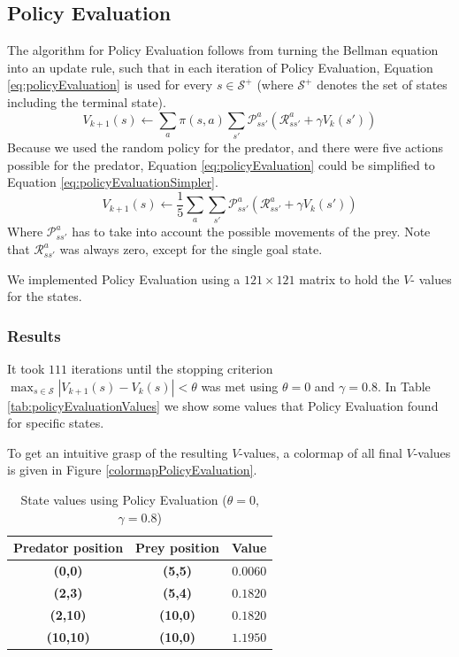 \documentclass{article}
\begin{document}
\subsection{ Policy Evaluation}
The algorithm for Policy Evaluation follows from turning the Bellman equation into an update rule, such that in each iteration of Policy Evaluation, Equation \ref{eq:policyEvaluation} is used for every $s \in \mathcal S^{+}$ (where $\mathcal S^{+}$ denotes the set of states including the terminal state).
\begin{equation}\label{eq:policyEvaluation}
V_{k+1}(s) \leftarrow \sum_{a} \pi (s,a) \sum_{s'}  \mathcal P_{s s'}^{a} \left( \mathcal R_{s s'}^{a} 
+ \gamma V_{k}(s') \right) 
\end{equation}
Because we used the random policy for the predator, and there were five actions possible for the predator, Equation \ref{eq:policyEvaluation} could be simplified to Equation \ref{eq:policyEvaluationSimpler}.
\begin{equation}\label{eq:policyEvaluationSimpler}
V_{k+1}(s) \leftarrow \frac{1}{5} \sum_{a}  \sum_{s'}  \mathcal P_{s s'}^{a} \left( \mathcal R_{s s'}^{a} 
+ \gamma V_{k}(s') \right) 
\end{equation}
Where $\mathcal P_{s s'}^{a}$ has to take into account the possible movements of the prey. Note that $\mathcal R_{s s'}^{a}$ was always zero, except for the single goal state.

We implemented Policy Evaluation using a $121 \times 121$ matrix to hold the $V$- values for the states. 

\subsubsection{Results}
It took $111$ iterations until the stopping criterion $\max_{s \in \mathcal S} | V_{ k+1}(s) - V_{k}(s) | < \theta$ was met using $\theta = 0$ and $\gamma = 0.8$.
In Table \ref{tab:policyEvaluationValues} we show some values that Policy Evaluation found for specific states.

To get an intuitive grasp of the resulting $V$-values, a colormap of all final $V$-values is given in Figure \ref{colormapPolicyEvaluation}.

\begin{table}[hbt]
\centering
\label{tab:policyEvaluation}
\begin{tabular}{|c|c|c|}
\hline 
Predator position & Prey position & Value \\ 
\hline 
\textbf{(0,0)} & \textbf{(5,5)} &  $0.0060$		 \\ 
\hline 
\textbf{(2,3)} & \textbf{(5,4) }& $0.1820$ \\ 
\hline 
\textbf{(2,10)} & \textbf{(10,0) }&  $0.1820$ \\ 
\hline 
\textbf{(10,10)} & \textbf{(10,0)} & $1.1950$ \\ 
\hline 
\end{tabular} 
\caption{State values using Policy Evaluation ($\theta = 0$, $\gamma = 0.8$)}
\end{table}
\end{document}
